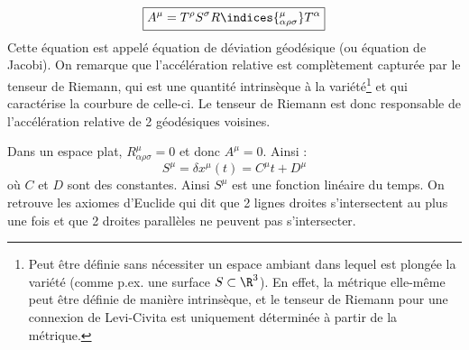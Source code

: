 \begin{equation}
    \boxed{A^{\mu} = T^{\rho}S^{\sigma}R\indices{^{\mu}_{\alpha \rho \sigma}}T^{\alpha}}
\end{equation}
Cette équation est appelé équation de déviation géodésique (ou équation de Jacobi). 
On remarque que l'accélération relative est complètement capturée par le tenseur de Riemann, qui est une quantité intrinsèque à la variété\footnote{Peut être définie sans nécessiter un espace ambiant dans lequel est plongée la variété (comme p.ex. une surface $S \subset \R^3$). En effet, la métrique elle-même peut être définie de manière intrinsèque, et le tenseur de Riemann pour une connexion de Levi-Civita est uniquement déterminée à partir de la métrique.} et qui caractérise la courbure de celle-ci. Le tenseur de Riemann est donc responsable de l'accélération relative de 2 géodésiques voisines. 
\begin{exmp}
    Dans un espace plat, $R^{\mu}_{\alpha \rho \sigma} = 0$ et donc $A^{\mu} =0$. Ainsi :
    \begin{equation}
        S^{\mu} = \delta x^{\mu}(t) = C^{\mu}t + D^{\mu}
    \end{equation}
où $C$ et $D$ sont des constantes. Ainsi $S^{\mu}$ est une fonction linéaire du temps. On retrouve les axiomes d'Euclide qui dit que 2 lignes droites s'intersectent au plus une fois et que 2 droites parallèles ne peuvent pas s'intersecter.
\end{exmp}
